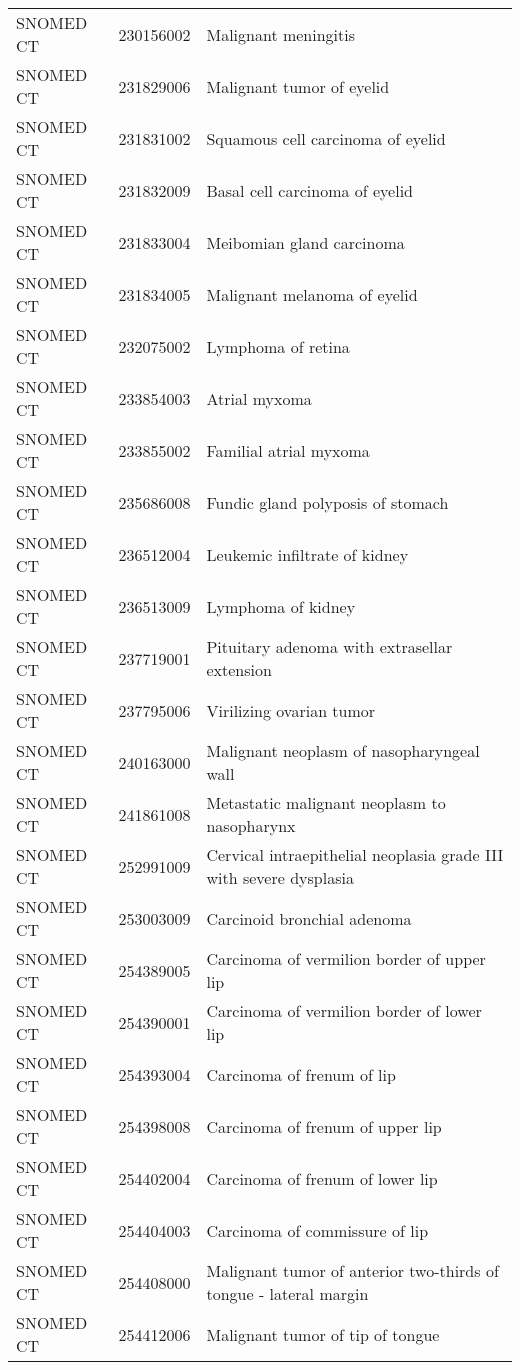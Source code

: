 \begin{longtable}{p{}p{}p{}}
  SNOMED CT & 230156002 & Malignant meningitis \\ 
  SNOMED CT & 231829006 & Malignant tumor of eyelid \\ 
  SNOMED CT & 231831002 & Squamous cell carcinoma of eyelid \\ 
  SNOMED CT & 231832009 & Basal cell carcinoma of eyelid \\ 
  SNOMED CT & 231833004 & Meibomian gland carcinoma \\ 
  SNOMED CT & 231834005 & Malignant melanoma of eyelid \\ 
  SNOMED CT & 232075002 & Lymphoma of retina \\ 
  SNOMED CT & 233854003 & Atrial myxoma \\ 
  SNOMED CT & 233855002 & Familial atrial myxoma \\ 
  SNOMED CT & 235686008 & Fundic gland polyposis of stomach \\ 
  SNOMED CT & 236512004 & Leukemic infiltrate of kidney \\ 
  SNOMED CT & 236513009 & Lymphoma of kidney \\ 
  SNOMED CT & 237719001 & Pituitary adenoma with extrasellar extension \\ 
  SNOMED CT & 237795006 & Virilizing ovarian tumor \\ 
  SNOMED CT & 240163000 & Malignant neoplasm of nasopharyngeal wall \\ 
  SNOMED CT & 241861008 & Metastatic malignant neoplasm to nasopharynx \\ 
  SNOMED CT & 252991009 & Cervical intraepithelial neoplasia grade III with severe dysplasia \\ 
  SNOMED CT & 253003009 & Carcinoid bronchial adenoma \\ 
  SNOMED CT & 254389005 & Carcinoma of vermilion border of upper lip \\ 
  SNOMED CT & 254390001 & Carcinoma of vermilion border of lower lip \\ 
  SNOMED CT & 254393004 & Carcinoma of frenum of lip \\ 
  SNOMED CT & 254398008 & Carcinoma of frenum of upper lip \\ 
  SNOMED CT & 254402004 & Carcinoma of frenum of lower lip \\ 
  SNOMED CT & 254404003 & Carcinoma of commissure of lip \\ 
  SNOMED CT & 254408000 & Malignant tumor of anterior two-thirds of tongue - lateral margin \\ 
  SNOMED CT & 254412006 & Malignant tumor of tip of tongue \\ 

\end{longtable}
